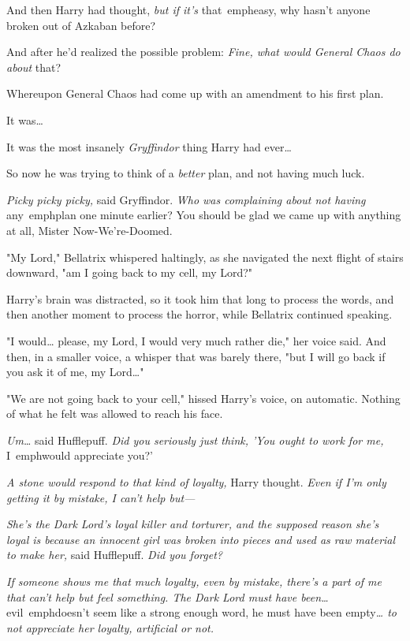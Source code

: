 And then Harry had thought, \emph{but if it's} that\ emph{easy, why hasn't 
anyone broken out of Azkaban before?}

And after he'd realized the possible problem: \emph{Fine, what would General 
Chaos do about} that?

Whereupon General Chaos had come up with an amendment to his first plan.

It was{\ldots}

It was the most insanely \emph{Gryffindor} thing Harry had ever{\ldots}

So now he was trying to think of a \emph{better} plan, and not having much luck.

\emph{Picky picky picky,} said Gryffindor. \emph{Who was complaining about not 
having} any\ emph{plan one minute earlier? You should be glad we came up with 
anything at all, Mister Now-We're-Doomed.}

"My Lord," Bellatrix whispered haltingly, as she navigated the next flight of 
stairs downward, "am I going back to my cell, my Lord?"

Harry's brain was distracted, so it took him that long to process the words, 
and then another moment to process the horror, while Bellatrix continued 
speaking.

"I would{\ldots} please, my Lord, I would very much rather die," her voice 
said. And then, in a smaller voice, a whisper that was barely there, "but I 
will go back if you ask it of me, my Lord{\ldots}"

"We are not going back to your cell," hissed Harry's voice, on automatic. 
Nothing of what he felt was allowed to reach his face.

\emph{Um{\ldots}} said Hufflepuff. \emph{Did you seriously just think, 'You 
ought to work for me,} I\ emph{would appreciate you?'}

\emph{A stone would respond to that kind of loyalty,} Harry thought. \emph{Even 
if I'm only getting it by mistake, I can't help but---}

\emph{She's the Dark Lord's loyal killer and torturer, and the supposed reason 
she's loyal is because an innocent girl was broken into pieces and used as raw 
material to make her,} said Hufflepuff. \emph{Did you forget?}

\emph{If someone shows me that much loyalty, even by mistake, there's a part of 
me that can't help but feel something. The Dark Lord must have been{\ldots}} 
evil\ emph{doesn't seem like a strong enough word, he must have been} 
empty\emph{{\ldots} to not appreciate her loyalty, artificial or not.}


